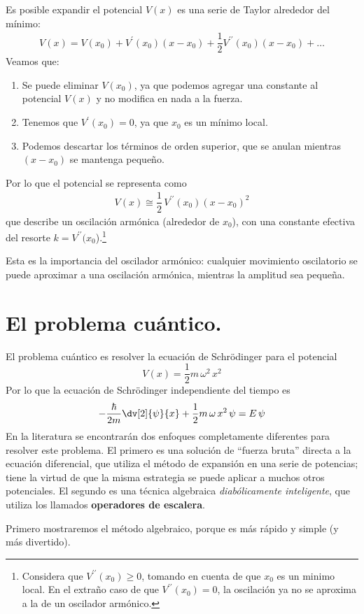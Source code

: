 Es posible expandir el potencial $V(x)$ es una serie de Taylor alrededor del mínimo:
\begin{align*}
V(x) = V(x_{0}) + V^{\prime} (x_{0}) (x - x_{0}) + \dfrac{1}{2} V^{\prime \prime} (x_{0}) (x - x_{0}) + \ldots
\end{align*}
Veamos que:
\begin{enumerate}
\item Se puede eliminar $V(x_{0})$, ya que podemos agregar una constante al potencial $V(x)$ y no modifica en nada a la fuerza.
\item Tenemos que $V^{\prime}(x_{0}) = 0$, ya que $x_{0}$ es un mínimo local.
\item Podemos descartar los términos de orden superior, que se anulan mientras $(x - x_{0})$ se mantenga pequeño.
\end{enumerate}
Por lo que el potencial se representa como
\begin{align*}
V(x) \cong \dfrac{1}{2} \, V^{\prime \prime} (x_{0}) (x - x_{0})^{2}
\end{align*}
que describe un oscilación armónica (alrededor de $x_{0}$), con una constante efectiva del resorte $k = V^{\prime \prime} (x_{0}$).\footnote{Considera que $V^{\prime \prime}(x_{0})\geq 0$, tomando en cuenta de que $x_{0}$ es un minimo local. En el extraño caso de que $V^{\prime \prime} (x_{0})= 0$, la oscilación ya no se aproxima a la de un oscilador armónico.}
\par
Esta es la importancia del oscilador armónico: cualquier movimiento oscilatorio se puede aproximar a una oscilación armónica, mientras la amplitud sea pequeña.
\section{El problema cuántico.}
El problema cuántico es resolver la ecuación de Schrödinger para el potencial
\begin{equation}
V(x) = \dfrac{1}{2} m \, \omega^{2} \, x^{2}
\label{eq:ecuacion_02_038}
\end{equation}
Por lo que la ecuación de Schrödinger independiente del tiempo es
\begin{equation}
- \dfrac{\hbar}{2 m} \dv[2]{\psi}{x} + \dfrac{1}{2} m \, \omega \, x^{2} \, \psi = E \, \psi
\label{eq:ecuacion_02_039}
\end{equation}
En la literatura se encontrarán dos enfoques completamente diferentes para resolver este problema. El primero es una solución de \enquote{fuerza bruta} directa a la ecuación diferencial, que utiliza el método de expansión en una serie de potencias; tiene la virtud de que la misma estrategia se puede aplicar a muchos otros potenciales. El segundo es una técnica algebraica \emph{diabólicamente inteligente}, que utiliza los llamados \textbf{operadores de escalera}.
\par
Primero mostraremos el método algebraico, porque es más rápido y simple (y más divertido).
